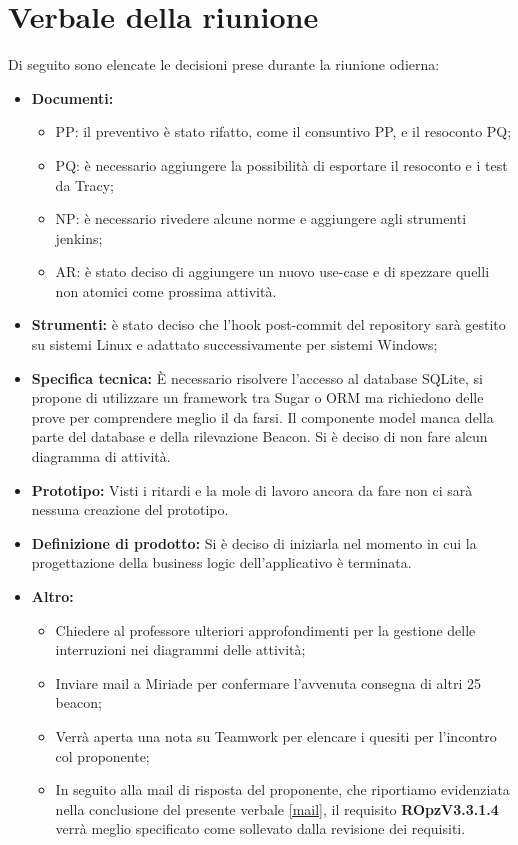 \documentclass[../RiunioneInterna16-02-19.tex]{subfiles}
\begin{document}
\section{Verbale della riunione}
Di seguito sono elencate le decisioni prese durante la riunione odierna:
\begin{itemize}
\item \textbf{Documenti:}
	\begin{itemize}
		\item PP: il preventivo è stato rifatto, come il consuntivo PP, e il resoconto PQ;
		\item PQ: è necessario aggiungere la possibilità di esportare il resoconto e i test da Tracy;
		\item NP: è necessario rivedere alcune norme e aggiungere agli strumenti jenkins;
		\item AR: è stato deciso di aggiungere un nuovo use-case e di spezzare quelli non atomici come prossima attività.
	\end{itemize}		
		
\item \textbf{Strumenti:} è stato deciso che l'hook post-commit del repository sarà gestito su sistemi Linux e adattato successivamente per sistemi Windows;


\item \textbf{Specifica tecnica:}
	È necessario risolvere l'accesso al database SQLite, si propone di utilizzare un framework tra Sugar o ORM ma richiedono delle prove per comprendere meglio il da farsi.
	Il componente model manca della parte del database e della rilevazione Beacon. Si è deciso di non fare alcun diagramma di attività.
	
	
\item \textbf{Prototipo:}
	Visti i ritardi e la mole di lavoro ancora da fare non ci sarà nessuna creazione del prototipo.

\item \textbf{Definizione di prodotto:}
	Si è deciso di iniziarla nel momento in cui la progettazione della business logic dell'applicativo è terminata.
	
\item \textbf{Altro:}
	\begin{itemize}
		\item Chiedere al professore ulteriori approfondimenti per la gestione delle interruzioni nei diagrammi delle attività;
		\item Inviare mail a Miriade per confermare l'avvenuta consegna di altri 25 beacon;
		\item Verrà aperta una nota su Teamwork per elencare i quesiti per l'incontro col proponente;
		\item In seguito alla mail di risposta del proponente, che riportiamo evidenziata nella conclusione del presente verbale \ref{mail}, il requisito \textbf{ROpzV3.3.1.4} verrà meglio specificato come sollevato dalla revisione dei requisiti.
	\end{itemize}
	
\end{itemize}
\end{document}
